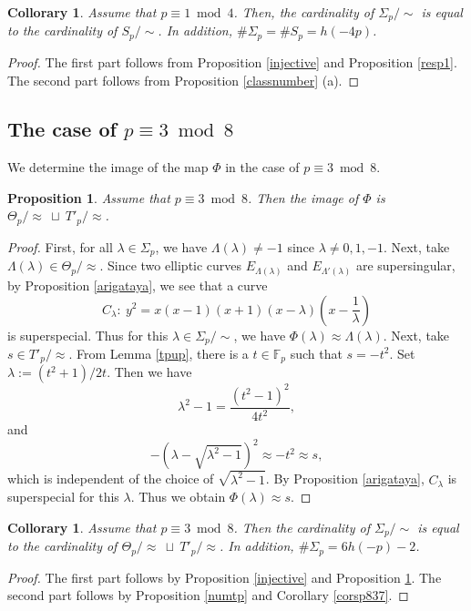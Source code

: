 \documentclass[a4paper, 11pt]{article}
\theoremstyle{plain}
\newtheorem{prop}[defn]{Proposition}
\newtheorem{cor}[defn]{Collorary}
\newcommand{\?}{\textcolor{red}{??}}
\newcommand{\lm}{\lambda}
\newcommand{\Lm}{\Lambda}
\newcommand{\fp}{\mathbb{F}_p}
\begin{document}
\begin{cor}
\label{number1}
Assume that $p \equiv 1 \bmod4$. Then, the cardinality of ${\Sigma}_{p}/\sim$ is equal to the cardinality of $S_{p}/\sim$. In addition, $\#{\Sigma}_{p}=\# S_{p}=h(-4p)$.
\end{cor}

\begin{proof}
    The first part follows from Proposition \ref{injective} and Proposition \ref{resp1}. The second part follows from Proposition \ref{classnumber} (a).
    \end{proof}

\subsection{The case of {$p \equiv 3  \bmod 8$}}
We determine the image of the map $\Phi$ in the case of $p \equiv 3 \bmod 8$. 
\begin{prop}
\label{sur3}
Assume that $p \equiv 3 \bmod 8$. Then the image of $\Phi$ is ${\Theta}_{p}/\approx \ \sqcup \  T'_p/\approx$.

\end{prop}

\begin{proof}
First, for all $\lm \in {\Sigma}_{p}$, we have $\Lm(\lm) \neq -1$ since $\lm \neq 0,1,-1$. Next, take $\Lm(\lm) \in {\Theta}_p/\approx$. Since two elliptic curves $E_{\Lm(\lm)}$ and $E_{{\Lm}'(\lm)}$ are supersingular, by Proposition \ref{arigataya}, we see that a curve
        \[
        C_{\lm}:\ y^2=x(x-1)(x+1)(x-\lm)\left(x-\frac{1}{\lm} \right)
        \]
        is superspecial. Thus for this $\lm \in {\Sigma}_p /\sim$, we have ${\Phi}(\lm) \approx \Lm(\lm)$.
        Next, take $s\in T'_p / \approx$. 
        From Lemma \ref{tpup}, there is a $t\in \fp$ such that $s=-t^2$. Set $\lm:=(t^2+1)/2t$. Then we have 
        \[
        {\lm}^2-1=\frac{(t^2-1)^2}{4t^2},
        \]
        and
        \[
        -(\lm-\sqrt{{\lm}^2-1})^2\approx -t^2 \approx s,
        \]
        which is independent of the choice of $\sqrt{{\lm}^2-1}$. By Proposition \ref{arigataya}, $C_{\lm}$ is superspecial for this $\lm$. Thus we obtain ${\Phi}(\lm) \approx s$.
\end{proof}

\begin{cor}
\label{number3}
    Assume that $p \equiv 3 \bmod 8$. Then the cardinality of ${\Sigma}_p /\sim$ is equal to the cardinality of ${\Theta}_{p} /\approx \ \sqcup \ T'_p / \approx$. In addition, 
    $\# {\Sigma}_p=6h(-p)-2$.
\end{cor}
\begin{proof}
    The first part follows by Proposition \ref{injective} and Proposition \ref{sur3}. The second part follows by Proposition \ref{numtp} and Corollary \ref{corsp837}.
\end{proof}
\end{document}
